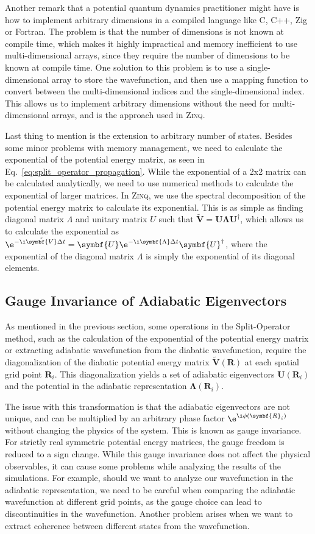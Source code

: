 Another remark that a potential quantum dynamics practitioner might have is how to implement arbitrary dimensions in a compiled language like C, C++, Zig or Fortran. The problem is that the number of dimensions is not known at compile time, which makes it highly impractical and memory inefficient to use multi-dimensional arrays, since they require the number of dimensions to be known at compile time. One solution to this problem is to use a single-dimensional array to store the wavefunction, and then use a mapping function to convert between the multi-dimensional indices and the single-dimensional index. This allows us to implement arbitrary dimensions without the need for multi-dimensional arrays, and is the approach used in \textsc{Zinq}.

Last thing to mention is the extension to arbitrary number of states. Besides some minor problems with memory management, we need to calculate the exponential of the potential energy matrix, as seen in Eq.~\eqref{eq:split_operator_propagation}. While the exponential of a 2x2 matrix can be calculated analytically, we need to use numerical methods to calculate the exponential of larger matrices. In \textsc{Zinq}, we use the spectral decomposition of the potential energy matrix to calculate its exponential. This is as simple as finding diagonal matrix $\Lambda$ and unitary matrix $U$ such that $\tilde{\symbf{V}}=\symbf{U}\symbf{\Lambda}\symbf{U}^\dagger$, which allows us to calculate the exponential as $\e^{-\i\tilde{\symbf{V}}\Delta t}=\symbf{U}\e^{-\i\symbf{\Lambda}\Delta t}\symbf{U}^\dagger$, where the exponential of the diagonal matrix $\Lambda$ is simply the exponential of its diagonal elements.
\subsection{Gauge Invariance of Adiabatic Eigenvectors}
As mentioned in the previous section, some operations in the Split-Operator method, such as the calculation of the exponential of the potential energy matrix or extracting adiabatic wavefunction from the diabatic wavefunction, require the diagonalization of the diabatic potential energy matrix $\tilde{\symbf{V}}(\symbf{R})$ at each spatial grid point $\symbf{R}_i$. This diagonalization yields a set of adiabatic eigenvectors $\symbf{U}(\symbf{R}_i)$ and the potential in the adiabatic representation $\symbf{\Lambda}(\symbf{R}_i)$.

The issue with this transformation is that the adiabatic eigenvectors are not unique, and can be multiplied by an arbitrary phase factor $\e^{\i\phi(\symbf{R}_i)}$ without changing the physics of the system. This is known as gauge invariance. For strictly real symmetric potential energy matrices, the gauge freedom is reduced to a sign change. While this gauge invariance does not affect the physical observables, it can cause some problems while analyzing the results of the simulations. For example, should we want to analyze our wavefunction in the adiabatic representation, we need to be careful when comparing the adiabatic wavefunction at different grid points, as the gauge choice can lead to discontinuities in the wavefunction. Another problem arises when we want to extract coherence between different states from the wavefunction.

